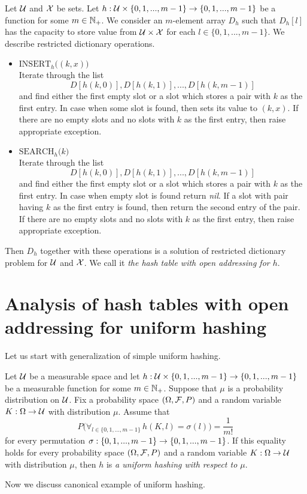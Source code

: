 \begin{definition}
Let ${\mathcal U}$ and ${\mathcal X}$ be sets. Let $h:{\mathcal U}\times \{0,1,...,m-1\}\rightarrow \{0,1,...,m-1\}$ be a function for some $m\in {\mathbb N}_+$. We consider an $m$-element array $D_h$ such that $D_h[l]$ has the capacity to store value from ${\mathcal U}\times {\mathcal X}$ for each $l\in \{0,1,...,m-1\}$. We describe restricted dictionary operations.
\begin{itemize}
\item[] $\textrm{INSERT}_h\big((k,x)\big)$\\
Iterate through the list
$$D[h(k,0)], D[h(k,1)],...,D[h(k,m-1)]$$
and find either the first empty slot or a slot which stores a pair with $k$ as the first entry. In case when some slot is found, then sets its value to $(k,x)$. If there are no empty slots and no slots with $k$ as the first entry, then raise appropriate exception.
\item[] $\textrm{SEARCH}_h\big(k\big)$\\
Iterate through the list
$$D[h(k,0)], D[h(k,1)],...,D[h(k,m-1)]$$
and find either the first empty slot or a slot which stores a pair with $k$ as the first entry. In case when empty slot is found return \textit{nil}. If a slot with pair having $k$ as the first entry is found, then return the second entry of the pair. If there are no empty slots and no slots with $k$ as the first entry, then raise appropriate exception.
\end{itemize}
Then $D_h$ together with these operations is a solution of restricted dictionary problem for ${\mathcal U}$ and ${\mathcal X}$. We call it \textit{the hash table with open addressing for $h$}.
\end{definition}

\section{Analysis of hash tables with open addressing for uniform hashing}
\noindent
Let us start with generalization of simple uniform hashing.

\begin{definition}
Let ${\mathcal U}$ be a measurable space and let $h:{\mathcal U}\times \{0,1,...,m-1\} \rightarrow \{0,1,...,m-1\}$ be a measurable function for some $m\in {\mathbb N}_+$. Suppose that $\mu$ is a probability distribution on ${\mathcal U}$. Fix a probability space $\left(\Omega,{\mathcal F},P\right)$ and a random variable $K:\Omega\rightarrow {\mathcal U}$ with distribution $\mu$. Assume that
$$P\big( \forall_{l\in \{0,1,...,m-1\}}\,h(K, l) = \sigma(l) \big) =\frac{1}{m!}$$
for every permutation $\sigma:\{0,1,...,m-1\}\rightarrow \{0,1,...,m-1\}$. If this equality holds for every probability space $\left(\Omega,{\mathcal F},P\right)$ and a random variable $K:\Omega\rightarrow {\mathcal U}$ with distribution $\mu$, then $h$ is \textit{a uniform hashing with respect to $\mu$}.
\end{definition}
\noindent
Now we discuss canonical example of uniform hashing.

